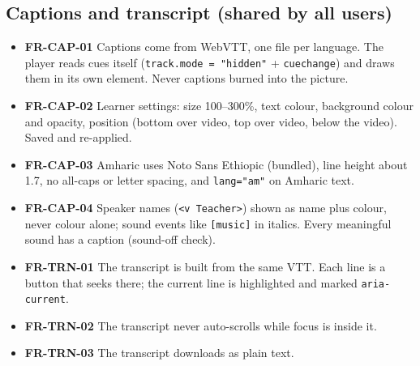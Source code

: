 \documentclass[11pt,a4paper]{article}
\newcommand{\code}[1]{\texttt{#1}}
\newcommand{\req}[1]{\textbf{#1}}
\begin{document}
\subsection{Captions and transcript (shared by all users)}
\begin{itemize}
  \item \req{FR-CAP-01} Captions come from WebVTT, one file per language. The player reads cues itself (\code{track.mode = "hidden"} + \code{cuechange}) and draws them in its own element. Never captions burned into the picture.
  \item \req{FR-CAP-02} Learner settings: size 100--300\%, text colour, background colour and opacity, position (bottom over video, top over video, below the video). Saved and re-applied.
  \item \req{FR-CAP-03} Amharic uses Noto Sans Ethiopic (bundled), line height about 1.7, no all-caps or letter spacing, and \code{lang="am"} on Amharic text.
  \item \req{FR-CAP-04} Speaker names (\code{<v Teacher>}) shown as name plus colour, never colour alone; sound events like \code{[music]} in italics. Every meaningful sound has a caption (sound-off check).
  \item \req{FR-TRN-01} The transcript is built from the same VTT. Each line is a button that seeks there; the current line is highlighted and marked \code{aria-current}.
  \item \req{FR-TRN-02} The transcript never auto-scrolls while focus is inside it.
  \item \req{FR-TRN-03} The transcript downloads as plain text.
\end{itemize}
\end{document}
